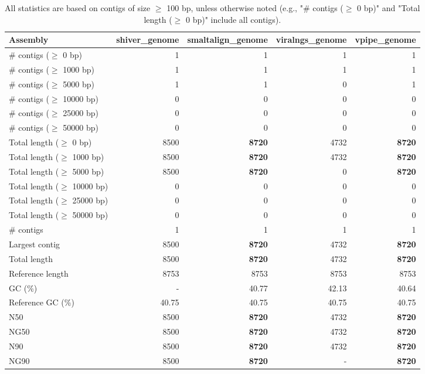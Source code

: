 \documentclass[12pt,a4paper]{article}
\begin{document}
\begin{table}[ht]
\begin{center}
\caption{All statistics are based on contigs of size $\geq$ 100 bp, unless otherwise noted (e.g., "\# contigs ($\geq$ 0 bp)" and "Total length ($\geq$ 0 bp)" include all contigs).}
\begin{tabular}{|l*{4}{|r}|}
\hline
Assembly & shiver\_genome & smaltalign\_genome & viralngs\_genome & vpipe\_genome \\ \hline
\# contigs ($\geq$ 0 bp) & 1 & 1 & 1 & 1 \\ \hline
\# contigs ($\geq$ 1000 bp) & 1 & 1 & 1 & 1 \\ \hline
\# contigs ($\geq$ 5000 bp) & 1 & 1 & 0 & 1 \\ \hline
\# contigs ($\geq$ 10000 bp) & 0 & 0 & 0 & 0 \\ \hline
\# contigs ($\geq$ 25000 bp) & 0 & 0 & 0 & 0 \\ \hline
\# contigs ($\geq$ 50000 bp) & 0 & 0 & 0 & 0 \\ \hline
Total length ($\geq$ 0 bp) & 8500 & {\bf 8720} & 4732 & {\bf 8720} \\ \hline
Total length ($\geq$ 1000 bp) & 8500 & {\bf 8720} & 4732 & {\bf 8720} \\ \hline
Total length ($\geq$ 5000 bp) & 8500 & {\bf 8720} & 0 & {\bf 8720} \\ \hline
Total length ($\geq$ 10000 bp) & 0 & 0 & 0 & 0 \\ \hline
Total length ($\geq$ 25000 bp) & 0 & 0 & 0 & 0 \\ \hline
Total length ($\geq$ 50000 bp) & 0 & 0 & 0 & 0 \\ \hline
\# contigs & 1 & 1 & 1 & 1 \\ \hline
Largest contig & 8500 & {\bf 8720} & 4732 & {\bf 8720} \\ \hline
Total length & 8500 & {\bf 8720} & 4732 & {\bf 8720} \\ \hline
Reference length & 8753 & 8753 & 8753 & 8753 \\ \hline
GC (\%) & - & 40.77 & 42.13 & 40.64 \\ \hline
Reference GC (\%) & 40.75 & 40.75 & 40.75 & 40.75 \\ \hline
N50 & 8500 & {\bf 8720} & 4732 & {\bf 8720} \\ \hline
NG50 & 8500 & {\bf 8720} & 4732 & {\bf 8720} \\ \hline
N90 & 8500 & {\bf 8720} & 4732 & {\bf 8720} \\ \hline
NG90 & 8500 & {\bf 8720} & - & {\bf 8720} \\ \hline

\end{tabular}
\end{center}
\end{table}
\end{document}
